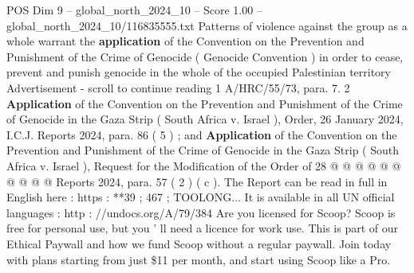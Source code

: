 \begin{textsample}{POS Dim 9 – global\_north\_2024\_10 – Score 1.00 – global\_north\_2024\_10/116835555.txt}
Patterns of violence against the group as a whole warrant the \textbf{application} of the Convention on the Prevention and Punishment of the Crime of Genocide ( Genocide Convention ) in order to cease, prevent and punish genocide in the whole of the occupied Palestinian territory Advertisement - scroll to continue reading 1 A/HRC/55/73, para. 7. 2 \textbf{Application} of the Convention on the Prevention and Punishment of the Crime of Genocide in the Gaza Strip ( South Africa v.
Israel ), Order, 26 January 2024, I.C.J.
Reports 2024, para. 86 ( 5 ) ; and \textbf{Application} of the Convention on the Prevention and Punishment of the Crime of Genocide in the Gaza Strip ( South Africa v.
Israel ), Request for the Modification of the Order of 28 @ @ @ @ @ @ @ @ @ @ Reports 2024, para. 57 ( 2 ) ( c ).
The Report can be read in full in English here : https : **39 ; 467 ; TOOLONG...
It is available in all UN official languages : http : //undocs.org/A/79/384 Are you licensed for Scoop?
Scoop is free for personal use, but you ' ll need a licence for work use.
This is part of our Ethical Paywall and how we fund Scoop without a regular paywall.
Join today with plans starting from just \$11 per month, and start using Scoop like a Pro.

\end{textsample}
